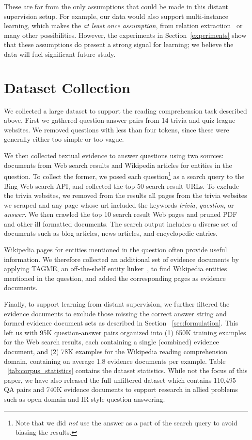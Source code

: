 These are far from the only assumptions that could be made in this distant supervision setup. For example, our data would also support multi-instance learning, which makes the {\em at least once assumption}, from relation extraction~\cite{riedel-ecml10,Hoffmann:11} or many other possibilities. However, the experiments in Section~\ref{experiments} show that these assumptions do present a strong signal for learning; we believe the data will fuel significant future study.

\section{Dataset Collection}
\label{sec:data_collection}

We collected a large dataset to support the reading comprehension task described above. First we gathered question-answer pairs from 14 trivia and quiz-league websites. We removed questions with less than four tokens, since these were generally either too simple or too vague. 

We then collected textual evidence to answer questions using two sources: documents from Web search results and Wikipedia articles for entities in the question. To collect the former, we posed each question\footnote{Note that we did {\em not} use the answer as a part of the search query to avoid biasing the results.} as a search query to the Bing Web search API, and collected the top 50 search result URLs.  To exclude the trivia websites, we removed from the results all pages from the trivia websites we scraped and any page whose url included the keywords \emph{trivia}, \emph{question}, or \emph{answer}. We then crawled the top 10 search result Web pages and pruned PDF and other ill formatted documents. The search output includes a diverse set of documents such as blog articles, news articles, and encyclopedic entries.

Wikipedia pages for entities mentioned in the question often provide useful information. We therefore collected an additional set of evidence documents by applying TAGME, an off-the-shelf entity linker~\cite{FerraginaTagme2010}, to find Wikipedia entities mentioned in the question, and added the corresponding pages as evidence documents. 

Finally, to support learning from distant supervision, we  further filtered the evidence documents to exclude those missing the correct answer string and formed evidence document sets as described in Section ~\ref{sec:formulation}. This left us with 95K question-answer pairs organized into (1) 650K training examples for the Web search results, each containing a single (combined) evidence document, and (2) 78K examples for the Wikipedia reading comprehension domain, containing on average 1.8 evidence documents per example. Table ~\ref{tab:corpus_statistics} contains the dataset statistics. While not the focus of this paper, we have also released the full unfiltered dataset which contains 110,495 QA pairs and 740K evidence documents to support research in allied problems such as open domain and IR-style question answering. 

